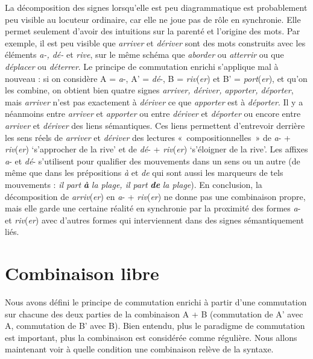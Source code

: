 La décomposition des signes lorsqu’elle est peu diagrammatique est probablement peu visible au locuteur ordinaire, car elle ne joue pas de rôle en synchronie. Elle permet seulement d’avoir des intuitions sur la parenté et l’origine des mots. Par exemple, il est peu visible que \textit{arriver} et \textit{dériver} sont des mots construits avec les éléments \textit{a-, dé-} et \textit{rive}, sur le même schéma que \textit{aborder} ou \textit{atterrir} ou que \textit{déplacer} ou \textit{déterrer}. Le principe de commutation enrichi s’applique mal à nouveau : si on considère A = \textit{a}{}-, A’ = \textit{dé}{}-, B = \textit{riv}(\textit{er}) et B’ = \textit{port}(\textit{er}), et qu’on les combine, on obtient bien quatre signes \textit{arriver, dériver, apporter, déporter}, mais \textit{arriver} n’est pas exactement à \textit{dériver} ce que \textit{apporter} est à \textit{déporter}. Il y a néanmoins entre \textit{arriver} et \textit{apporter} ou entre \textit{dériver} et \textit{déporter} ou encore entre \textit{arriver} et \textit{dériver} des liens sémantiques. Ces liens permettent d’entrevoir derrière les sens réels de \textit{arriver} et \textit{dériver} des lectures «~compositionnelles~» de \textit{a}{}- + \textit{riv}(\textit{er}) ‘s’approcher de la rive’ et de \textit{dé}{}- + \textit{riv}(\textit{er}) ‘s’éloigner de la rive’. Les affixes \textit{a}{}- et \textit{dé}{}- s’utilisent pour qualifier des mouvements dans un sens ou un autre (de même que dans les prépositions \textit{à} et \textit{de} qui sont aussi les marqueurs de tels mouvements : \textit{il part} \textbf{\textit{à}} \textit{la plage, il part} \textbf{\textit{de}} \textit{la plage}). En conclusion, la décomposition de \textit{arriv}(\textit{er}) en \textit{a}{}- + \textit{riv}(\textit{er}) ne donne pas une combinaison propre, mais elle garde une certaine réalité en synchronie par la proximité des formes \textit{a}{}- et \textit{riv}(\textit{er}) avec d’autres formes qui interviennent dans des signes sémantiquement liés.

\section{Combinaison libre}\label{sec:2.2.5}

Nous avons défini le principe de commutation enrichi à partir d’une commutation sur chacune des deux parties de la combinaison A + B (commutation de A’ avec A, commutation de B’ avec B). Bien entendu, plus le paradigme de commutation est important, plus la combinaison est considérée comme régulière. Nous allons maintenant voir à quelle condition une combinaison relève de la syntaxe.

